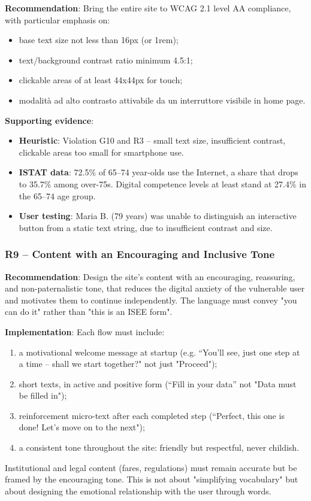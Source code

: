 ﻿\documentclass[11pt,a4paper]{article}
\begin{document}
\textbf{Recommendation}: Bring the entire site to WCAG 2.1 level
AA compliance, with particular emphasis on:
\begin{itemize}
    \item base text size not less than 16px (or 1rem);
    \item text/background contrast ratio minimum 4.5:1;
    \item clickable areas of at least 44x44px for touch;
    \item modalit\`a ad alto contrasto attivabile da un interruttore visibile
    in home page.
\end{itemize}

\textbf{Supporting evidence}:
\begin{itemize}
    \item \textbf{Heuristic}: Violation G10 and R3 -- small text size,
    insufficient contrast, clickable areas too small for smartphone
    use.
    \item \textbf{ISTAT data}: 72.5\% of 65--74 year-olds use the Internet,
    a share that drops to 35.7\% among over-75s. Digital competence levels at least
    stand at 27.4\% in the 65--74 age group.
    \item \textbf{User testing}: Maria B. (79 years) was unable to distinguish
    an interactive button from a static text string, due to
    insufficient contrast and size.
\end{itemize}

\subsubsection{R9 -- Content with an Encouraging and Inclusive Tone}
\label{rec:R9}

\textbf{Recommendation}: Design the site's content with an encouraging,
reassuring, and non-paternalistic tone, that reduces the digital
anxiety of the vulnerable user and motivates them to continue independently.
The language must convey "you can do it" rather than "this is
an ISEE form".

\textbf{Implementation}: Each flow must include:
\begin{enumerate}
    \item a motivational welcome message at startup (e.g. ``You'll see,
    just one step at a time -- shall we start together?" not just "Proceed");
    \item short texts, in active and positive form (``Fill in your data''
    not "Data must be filled in");
    \item reinforcement micro-text after each completed step (``Perfect,
    this one is done! Let's move on to the next");
    \item a consistent tone throughout the site: friendly but respectful,
    never childish.
\end{enumerate}
Institutional and legal content (fares, regulations) must remain
accurate but be framed by the encouraging tone. This is not about
"simplifying vocabulary" but about designing the emotional relationship
with the user through words.
\end{document}
